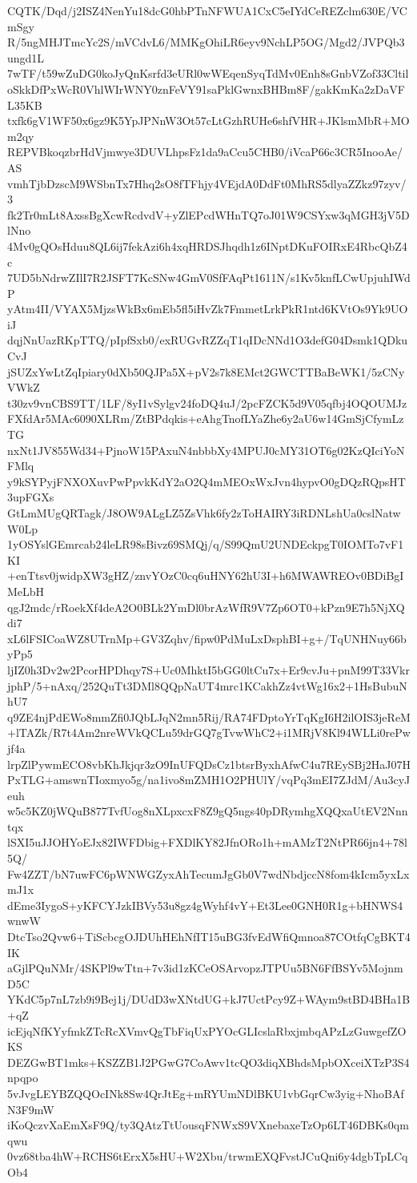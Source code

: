 CQTK/Dqd/j2ISZ4NenYu18dcG0hbPTnNFWUA1CxC5eIYdCeREZclm630E/VCmSgy
R/5ngMHJTmcYc2S/mVCdvL6/MMKgOhiLR6eyv9NchLP5OG/Mgd2/JVPQb3ungd1L
7wTF/t59wZuDG0koJyQnKsrfd3eURl0wWEqenSyqTdMv0Enh8sGnbVZof33Cltil
oSkkDfPxWcR0VhlWIrWNY0znFeVY91saPklGwnxBHBm8F/gakKmKa2zDaVFL35KB
txfk6gV1WF50x6gz9K5YpJPNnW3Ot57cLtGzhRUHe6shfVHR+JKlsmMbR+MOm2qy
REPVBkoqzbrHdVjmwye3DUVLhpsFz1da9aCcu5CHB0/iVcaP66c3CR5InooAe/AS
vmhTjbDzscM9WSbnTx7Hhq2sO8fTFhjy4VEjdA0DdFt0MhRS5dlyaZZkz97zyv/3
fk2Tr0mLt8AxssBgXcwRcdvdV+yZlEPcdWHnTQ7oJ01W9CSYxw3qMGH3jV5DlNno
4Mv0gQOsHduu8QL6ij7fekAzi6h4xqHRDSJhqdh1z6INptDKuFOIRxE4RbcQbZ4c
7UD5bNdrwZIlI7R2JSFT7KcSNw4GmV0SfFAqPt1611N/s1Kv5knfLCwUpjuhIWdP
yAtm4II/VYAX5MjzsWkBx6mEb5fl5iHvZk7FmmetLrkPkR1ntd6KVtOs9Yk9UOiJ
dqjNnUazRKpTTQ/pIpfSxb0/exRUGvRZZqT1qIDcNNd1O3defG04Dsmk1QDkuCvJ
jSUZxYwLtZqIpiary0dXb50QJPa5X+pV2s7k8EMct2GWCTTBaBeWK1/5zCNyVWkZ
t30zv9vnCBS9TT/1LF/8yI1vSylgv24foDQ4uJ/2pcFZCK5d9V05qfbj4OQOUMJz
FXfdAr5MAc6090XLRm/ZtBPdqkis+eAhgTnofLYaZhe6y2aU6w14GmSjCfymLzTG
nxNt1JV855Wd34+PjnoW15PAxuN4nbbbXy4MPUJ0cMY31OT6g02KzQIciYoNFMlq
y9kSYPyjFNXOXuvPwPpvkKdY2aO2Q4mMEOxWxJvn4hypvO0gDQzRQpsHT3upFGXs
GtLmMUgQRTagk/J8OW9ALgLZ5ZsVhk6fy2zToHAIRY3iRDNLshUa0cslNatwW0Lp
1yOSYslGEmrcab24leLR98sBivz69SMQj/q/S99QmU2UNDEckpgT0IOMTo7vF1KI
+enTtsv0jwidpXW3gHZ/znvYOzC0cq6uHNY62hU3I+h6MWAWREOv0BDiBgIMeLbH
qgJ2mdc/rRoekXf4deA2O0BLk2YmDl0brAzWfR9V7Zp6OT0+kPzn9E7h5NjXQdi7
xL6lFSICoaWZ8UTrnMp+GV3Zqhv/fipw0PdMuLxDsphBI+g+/TqUNHNuy66byPp5
ljIZ0h3Dv2w2PcorHPDhqy7S+Uc0MhktI5bGG0ltCu7x+Er9cvJu+pnM99T33Vkr
jphP/5+nAxq/252QuTt3DMl8QQpNaUT4mrc1KCakhZz4vtWg16x2+1HsBubuNhU7
q9ZE4njPdEWo8mmZfi0JQbLJqN2mn5Rij/RA74FDptoYrTqKgI6H2ilOIS3jeReM
+lTAZk/R7t4Am2nreWVkQCLu59drGQ7gTvwWhC2+i1MRjV8Kl94WLLi0rePwjf4a
lrpZlPywmECO8vbKhJkjqr3zO9InUFQDsCz1btsrByxhAfwC4u7REySBj2HaJ07H
PxTLG+amswnTIoxmyo5g/na1ivo8mZMH1O2PHUlY/vqPq3mEI7ZJdM/Au3cyJeuh
w5c5KZ0jWQuB877TvfUog8nXLpxcxF8Z9gQ5ngs40pDRymhgXQQxaUtEV2Nnntqx
lSXI5uJJOHYoEJx82IWFDbig+FXDlKY82JfnORo1h+mAMzT2NtPR66jn4+78l5Q/
Fw4ZZT/bN7uwFC6pWNWGZyxAhTecumJgGb0V7wdNbdjccN8fom4kIcm5yxLxmJ1x
dEme3IygoS+yKFCYJzkIBVy53u8gz4gWyhf4vY+Et3Lee0GNH0R1g+bHNWS4wnwW
DtcTso2Qvw6+TiScbcgOJDUhHEhNfIT15uBG3fvEdWfiQmnoa87COtfqCgBKT4IK
aGjlPQuNMr/4SKPl9wTtn+7v3id1zKCeOSArvopzJTPUu5BN6FfBSYv5MojnmD5C
YKdC5p7nL7zb9i9Bej1j/DUdD3wXNtdUG+kJ7UctPcy9Z+WAym9stBD4BHa1B+qZ
icEjqNfKYyfmkZTcRcXVmvQgTbFiqUxPYOcGLIcslaRbxjmbqAPzLzGuwgefZOKS
DEZGwBT1mks+KSZZB1J2PGwG7CoAwv1tcQO3diqXBhdsMpbOXceiXTzP3S4npqpo
5vJvgLEYBZQQOcINk8Sw4QrJtEg+mRYUmNDlBKU1vbGqrCw3yig+NhoBAfN3F9mW
iKoQczvXaEmXsF9Q/ty3QAtzTtUousqFNWxS9VXnebaxeTzOp6LT46DBKs0qmqwu
0vz68tba4hW+RCHS6tErxX5sHU+W2Xbu/trwmEXQFvstJCuQni6y4dgbTpLCqOb4
